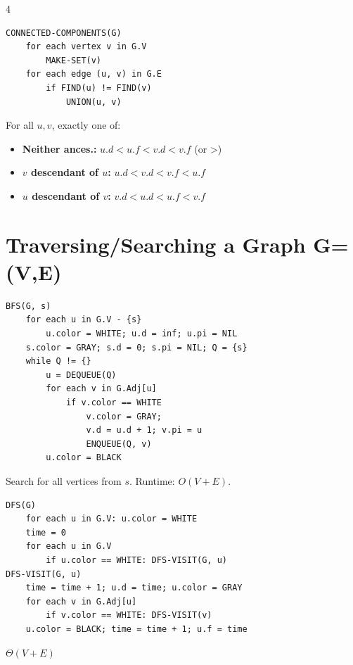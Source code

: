\documentclass[8pt,a4paper,landscape]{extarticle}
\begin{document}
\begin{multicols*}{4}
\begin{lstlisting}
CONNECTED-COMPONENTS(G)
    for each vertex v in G.V
        MAKE-SET(v)
    for each edge (u, v) in G.E
        if FIND(u) != FIND(v)
            UNION(u, v)
\end{lstlisting}

\begin{thm}[title=Parenthesis theorem]
For all $u,v$, exactly one of:
\begin{itemize}
  \item \textbf{Neither ances.:} $u.d<u.f<v.d<v.f$ (or >)
  \item \textbf{$v$ descendant of $u$:} $u.d<v.d<v.f<u.f$
  \item \textbf{$u$ descendant of $v$:} $v.d<u.d<u.f<v.f$
\end{itemize}
\end{thm}

\section{Traversing/Searching a Graph G=(V,E)}

\begin{lstlisting}
BFS(G, s)
    for each u in G.V - {s}
        u.color = WHITE; u.d = inf; u.pi = NIL
    s.color = GRAY; s.d = 0; s.pi = NIL; Q = {s}
    while Q != {}
        u = DEQUEUE(Q)
        for each v in G.Adj[u]
            if v.color == WHITE
                v.color = GRAY;
                v.d = u.d + 1; v.pi = u
                ENQUEUE(Q, v)
        u.color = BLACK
\end{lstlisting}

\begin{prop}[title=BFS properties]
Search for all vertices from $s$. Runtime: $O(V+E)$.
\end{prop}

\begin{lstlisting}
DFS(G)
    for each u in G.V: u.color = WHITE
    time = 0
    for each u in G.V
        if u.color == WHITE: DFS-VISIT(G, u)
DFS-VISIT(G, u)
    time = time + 1; u.d = time; u.color = GRAY
    for each v in G.Adj[u]
        if v.color == WHITE: DFS-VISIT(v)
    u.color = BLACK; time = time + 1; u.f = time
\end{lstlisting}

\begin{prop}[title=Runtime]
$\Theta(V+E)$
\end{prop}


\end{multicols*}
\end{document}
